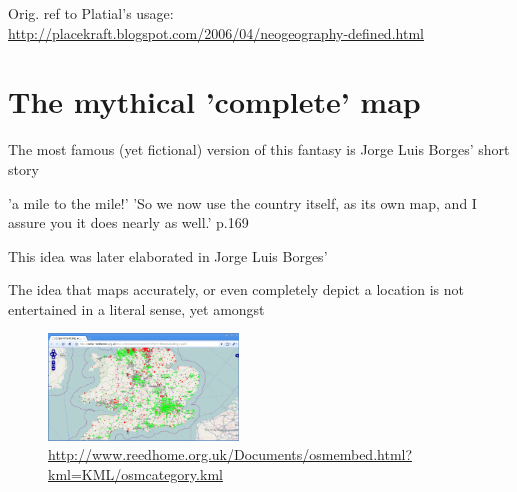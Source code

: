 \documentclass[11pt]{report}
\begin{document}
Orig. ref to Platial's usage: \url{http://placekraft.blogspot.com/2006/04/neogeography-defined.html}


\section{The mythical 'complete' map}

The most famous (yet fictional) version of this fantasy is Jorge Luis Borges' short story 

'a mile to the mile!'
'So we now use the country itself, as its own map, and I assure you it does nearly as well.' p.169

This idea was later elaborated in Jorge Luis Borges' 





The idea that maps accurately, or even completely depict a location is not entertained in a literal sense, yet amongst


\begin{figure}
	\begin{flushright}
		\includegraphics[width=0.45\textwidth]{images/osm-missing-parts.png}
	\url{http://www.reedhome.org.uk/Documents/osmembed.html?kml=KML/osmcategory.kml}
	\end{flushright}
\end{figure}
\end{document}
